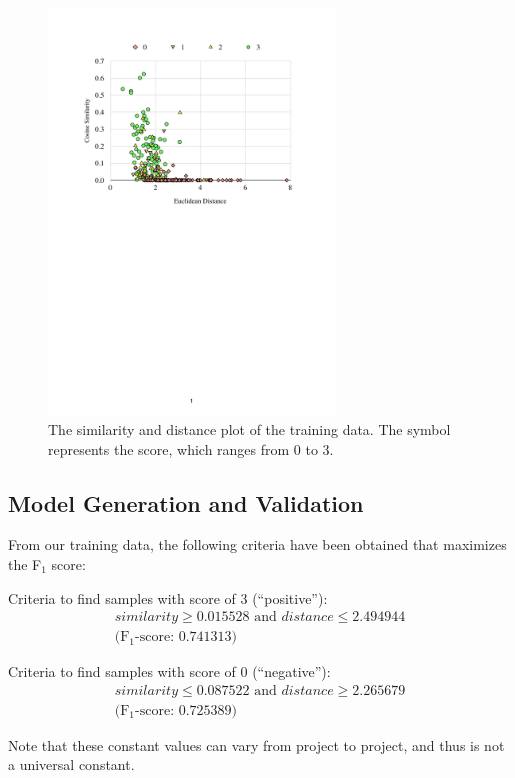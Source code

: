 \documentclass[conference]{IEEEtran}
\begin{document}
\begin{figure}[h]
\centering
\includegraphics[width=3in]{scatter}
\caption{The similarity and distance plot of the training data.
The symbol represents the score, which ranges from 0 to 3.}
\label{fig:scatter}
\end{figure}



\subsection{Model Generation and Validation}

From our training data,
the following criteria have been obtained that maximizes the F$_1$ score:

Criteria to find samples with score of 3 (``positive''):
\begin{gather*} similarity \geq 0.015528 \text{ and } distance \leq 2.494944
\\ \text{(F$_1$-score: 0.741313)} \end{gather*}

Criteria to find samples with score of 0 (``negative''):
\begin{gather*} similarity \leq 0.087522 \text{ and } distance \geq 2.265679
\\ \text{(F$_1$-score: 0.725389)}\end{gather*}

Note that these constant values can vary from project to project, and thus is not a universal constant.
\end{document}
